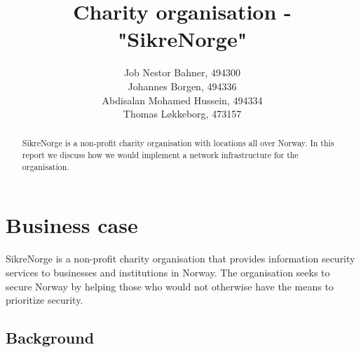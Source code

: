 

\title{Charity organisation - "SikreNorge"}

\author{
  Job Nestor Bahner, 494300\\
  Johannes Borgen, 494336\\
  Abdisalan Mohamed Hussein, 494334\\
  Thomas Løkkeborg, 473157\\
}



\maketitle

\begin{abstract}
SikreNorge is a non-profit charity organisation with locations all over Norway. In this report we discuss how we would implement a network infrastructure for the organisation.
\end{abstract}

\thispagestyle{empty}

\clearpage
{}
\setcounter{page}{1}
\tableofcontents

\clearpage
{}


\section{Business case}

SikreNorge is a non-profit charity organisation that provides information security services to businesses and institutions in Norway. The organisation seeks to secure Norway by helping those who would not otherwise have the means to prioritize security.

\subsection{Background} %

